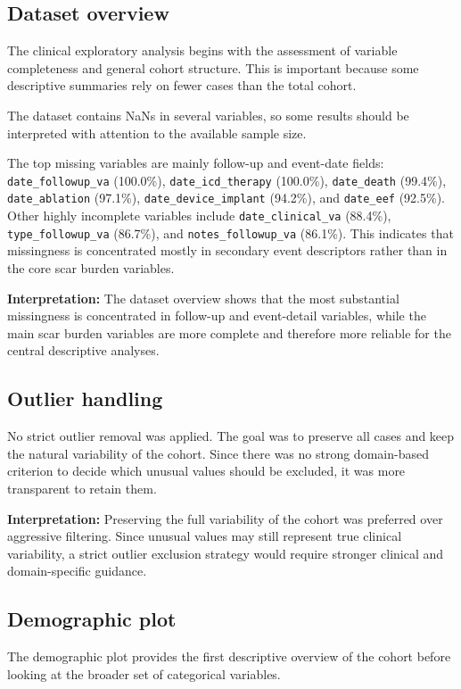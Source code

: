 \documentclass[11pt,a4paper]{article}
\begin{document}
    \subsection{Dataset overview}
    The clinical exploratory analysis begins with the assessment of variable completeness and general cohort structure. This is important because some descriptive summaries rely on fewer cases than the total cohort.

    The dataset contains NaNs in several variables, so some results should be interpreted with attention to the available sample size.

    The top missing variables are mainly follow-up and event-date fields: \texttt{date\_followup\_va} (100.0\%), \texttt{date\_icd\_therapy} (100.0\%), \texttt{date\_death} (99.4\%), \texttt{date\_ablation} (97.1\%), \texttt{date\_device\_implant} (94.2\%), and \texttt{date\_eef} (92.5\%). Other highly incomplete variables include \texttt{date\_clinical\_va} (88.4\%), \texttt{type\_followup\_va} (86.7\%), and \texttt{notes\_followup\_va} (86.1\%). This indicates that missingness is concentrated mostly in secondary event descriptors rather than in the core scar burden variables.

\noindent\textbf{Interpretation:} The dataset overview shows that the most substantial missingness is concentrated in follow-up and event-detail variables, while the main scar burden variables are more complete and therefore more reliable for the central descriptive analyses.

\subsection{Outlier handling}
No strict outlier removal was applied. The goal was to preserve all cases and keep the natural variability of the cohort. Since there was no strong domain-based criterion to decide which unusual values should be excluded, it was more transparent to retain them.

\noindent\textbf{Interpretation:} Preserving the full variability of the cohort was preferred over aggressive filtering. Since unusual values may still represent true clinical variability, a strict outlier exclusion strategy would require stronger clinical and domain-specific guidance.

    \subsection{Demographic plot}
The demographic plot provides the first descriptive overview of the cohort before looking at the broader set of categorical variables.
\end{document}
